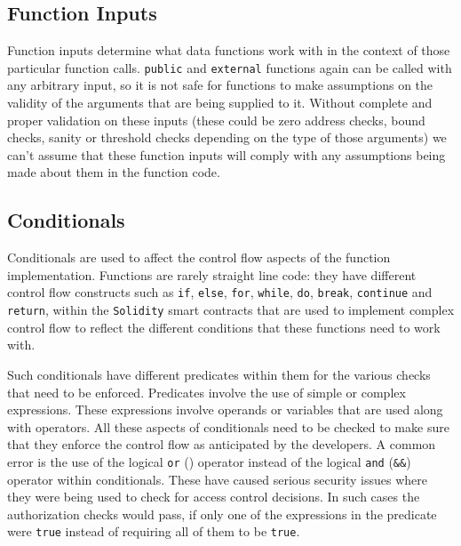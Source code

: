\subsection{Function Inputs}\label{function-inputs}

Function inputs determine what data functions work with in the context
of those particular function calls. \texttt{public} and
\texttt{external} functions again can be called with any arbitrary
input, so it is not safe for functions to make assumptions on the
validity of the arguments that are being supplied to it. Without
complete and proper validation on these inputs (these could be zero
address checks, bound checks, sanity or threshold checks depending on
the type of those arguments) we can't assume that these function inputs
will comply with any assumptions being made about them in the function
code.

\subsection{Conditionals}\label{conditionals}

Conditionals are used to affect the control flow aspects of the function
implementation. Functions are rarely straight line code: they have
different control flow constructs such as \texttt{if}, \texttt{else},
\texttt{for}, \texttt{while}, \texttt{do}, \texttt{break},
\texttt{continue} and \texttt{return}, within the \texttt{Solidity}
smart contracts that are used to implement complex control flow to
reflect the different conditions that these functions need to work with.

Such conditionals have different predicates within them for the various
checks that need to be enforced. Predicates involve the use of simple or
complex expressions. These expressions involve operands or variables
that are used along with operators. All these aspects of conditionals
need to be checked to make sure that they enforce the control flow as
anticipated by the developers. A common error is the use of the logical
\texttt{or} (\texttt{\textbar{}\textbar{}}) operator instead of the
logical \texttt{and} (\texttt{\&\&}) operator within conditionals. These
have caused serious security issues where they were being used to check
for access control decisions. In such cases the authorization checks
would pass, if only one of the expressions in the predicate were
\texttt{true} instead of requiring all of them to be \texttt{true}.
